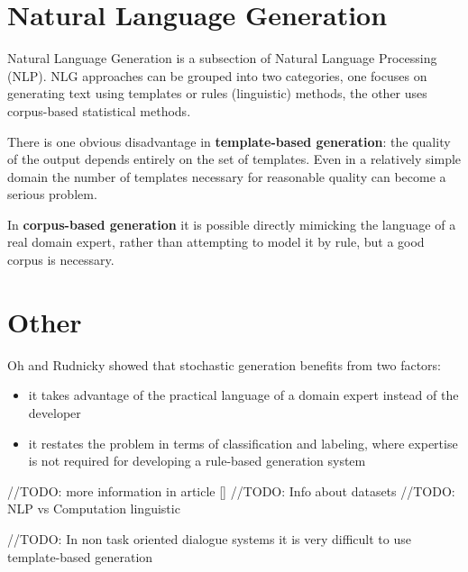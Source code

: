 \chapter{Natural Language Generation}\label{nlg}
Natural Language Generation is a subsection of Natural Language Processing (NLP). 
NLG approaches can be grouped into two categories, one focuses on generating text using templates or rules (linguistic) methods, the other uses corpus-based statistical methods. 

There is one obvious disadvantage in \textbf{template-based generation}: the quality of the output depends entirely on the set of templates. Even in a relatively  simple domain the number of templates necessary for reasonable quality can become a serious problem.

In \textbf{corpus-based generation} it is possible directly mimicking the language of a real domain expert, rather than attempting to model it by rule, but a good corpus is necessary.
\cite{stochastic_language_generation_ds}

\chapter{Other}
Oh and Rudnicky showed that stochastic generation benefits from two factors: 
\begin{itemize}
  \item it takes advantage of the practical language of a domain expert instead of the developer
  \item it restates the problem in terms of classification and labeling, where expertise is not required for developing a rule-based generation system
\end{itemize}

//TODO: more information in article []
//TODO: Info about datasets
//TODO: NLP vs Computation linguistic

//TODO: In non task oriented dialogue systems it is very difficult to use template-based generation
\cite{stochastic_language_generation_ds}
